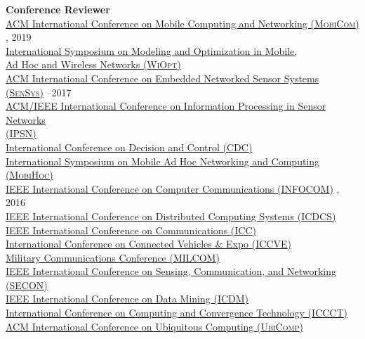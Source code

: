 {\bf Conference Reviewer}\\
{\href{https://sigmobile.org/mobicom/2019/}{ACM International Conference on Mobile Computing and Networking (\textsc{MobiCom})}} , 2019\\
{\href{http://www.wi-opt.org/}{International Symposium on Modeling and Optimization in Mobile, \\\mbox{\hspace{0.6cm}} Ad Hoc and Wireless Networks (\textsc{WiOpt})}} \\
{\href{http://sensys.acm.org}{ACM International Conference on Embedded Networked Sensor Systems (\textsc{SenSys})}} --2017\\
{\href{http://ipsn.acm.org/2017/}{ACM/IEEE International Conference on Information Processing in Sensor Networks \\\mbox{\hspace{0.6cm}} (\textsc{IPSN})}} \\
{\href{http://cdc2016.ieeecss.org/}{International Conference on Decision and Control (\textsc{CDC})}} \\
{\href{http://www.sigmobile.org/mobihoc/2016/}{International Symposium on Mobile Ad Hoc Networking and Computing (\textsc{MobiHoc})}} \\
{\href{http://infocom2016.ieee-infocom.org/}{IEEE International Conference on Computer Communications (\textsc{INFOCOM})}} , 2016\\
{\href{http://icdcs-2015.cse.ohio-state.edu/}{IEEE International Conference on Distributed Computing Systems (\textsc{ICDCS})}} \\
{\href{http://icc2015.ieee-icc.org/}{IEEE International Conference on Communications (\textsc{ICC})}} \\
{\href{http://www.iccve.org/2014/}{International Conference on Connected Vehicles \& Expo (\textsc{ICCVE})}} \\
{\href{http://www.milcom.org/2014/}{Military Communications Conference (\textsc{MILCOM})}} \\
{\href{http://secon2014.ieee-secon.org}{IEEE International Conference on Sensing, Communication, and Networking (\textsc{SECON})}} \\
{\href{http://icdm2013.rutgers.edu}{IEEE International Conference on Data Mining (\textsc{ICDM})}} \\
{\href{http://www.mnnit.ac.in/iccct2013}{International Conference on Computing and Convergence Technology (\textsc{ICCCT})}} \\
{\href{http://www.ubicomp.org/ubicomp2012}{ACM International Conference on Ubiquitous Computing (\textsc{UbiComp})}} \\
\vspace{-0.6cm}

